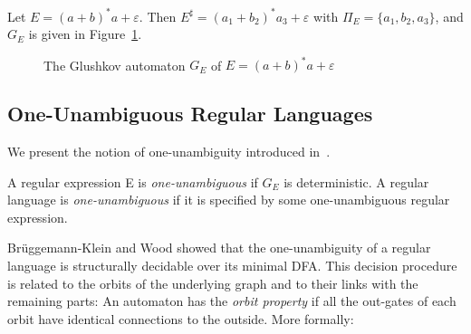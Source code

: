 \documentclass{llncs}
\begin{document}
\begin{example}
	Let $E = (a + b)^*a + \varepsilon$. Then $E^{\sharp} = (a_1 + b_2)^*a_3 + \varepsilon$ with $\Pi_E = \{a_1, b_2, a_3\}$, and $G_E$ is given in Figure~\ref{ExempleGlushkov}.
\end{example}

\begin{figure}[H]
	\centering
	

  \caption{The Glushkov automaton $G_E$ of $E = (a + b)^*a + \varepsilon$}
  \label{ExempleGlushkov}
\end{figure}


\subsection{One-Unambiguous Regular Languages}
	We present the notion of one-unambiguity introduced in~\cite{BW98}.

\begin{definition}
	A regular expression E is \emph{one-unambiguous} if $G_E$ is deterministic.
	A regular language is \emph{one-unambiguous} if it is specified by some one-unambiguous regular expression.
\end{definition}

	Brüggemann-Klein and Wood showed that the one-unambiguity of a regular language is structurally decidable over its minimal DFA. This decision procedure is related to the orbits of the underlying graph and to their links with the remaining parts:
	An automaton has the \emph{orbit property} if all the out-gates of each orbit have identical connections to the outside.
	More formally:
	
\end{document}
